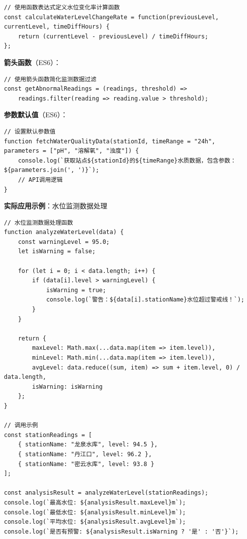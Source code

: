 \begin{lstlisting}
// 使用函数表达式定义水位变化率计算函数
const calculateWaterLevelChangeRate = function(previousLevel, currentLevel, timeDiffHours) {
    return (currentLevel - previousLevel) / timeDiffHours;
};
\end{lstlisting}

\textbf{箭头函数}（ES6）：

\begin{lstlisting}
// 使用箭头函数简化监测数据过滤
const getAbnormalReadings = (readings, threshold) => 
    readings.filter(reading => reading.value > threshold);
\end{lstlisting}

\textbf{参数默认值}（ES6）：

\begin{lstlisting}
// 设置默认参数值
function fetchWaterQualityData(stationId, timeRange = "24h", parameters = ["pH", "溶解氧", "浊度"]) {
    console.log(`获取站点${stationId}的${timeRange}水质数据，包含参数：${parameters.join(', ')}`);
    // API调用逻辑
}
\end{lstlisting}

\textbf{实际应用示例}：水位监测数据处理

\begin{lstlisting}
// 水位监测数据处理函数
function analyzeWaterLevel(data) {
    const warningLevel = 95.0;
    let isWarning = false;
    
    for (let i = 0; i < data.length; i++) {
        if (data[i].level > warningLevel) {
            isWarning = true;
            console.log(`警告：${data[i].stationName}水位超过警戒线！`);
        }
    }
    
    return {
        maxLevel: Math.max(...data.map(item => item.level)),
        minLevel: Math.min(...data.map(item => item.level)),
        avgLevel: data.reduce((sum, item) => sum + item.level, 0) / data.length,
        isWarning: isWarning
    };
}

// 调用示例
const stationReadings = [
    { stationName: "龙泉水库", level: 94.5 },
    { stationName: "丹江口", level: 96.2 },
    { stationName: "密云水库", level: 93.8 }
];

const analysisResult = analyzeWaterLevel(stationReadings);
console.log(`最高水位: ${analysisResult.maxLevel}m`);
console.log(`最低水位: ${analysisResult.minLevel}m`);
console.log(`平均水位: ${analysisResult.avgLevel}m`);
console.log(`是否有预警: ${analysisResult.isWarning ? '是' : '否'}`);
\end{lstlisting}

